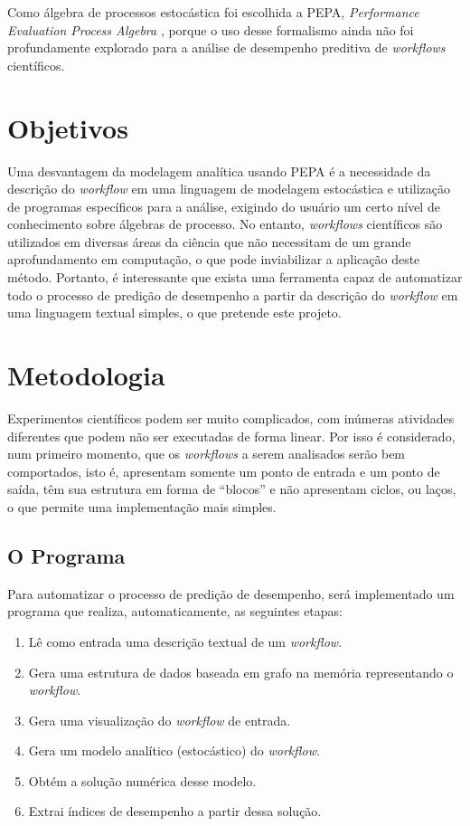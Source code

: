 \documentclass[a4paper,11pt]{article}
\begin{document}
  	Como álgebra de processos estocástica foi escolhida a PEPA, \emph{Performance Evaluation Process Algebra} \cite{web:pepa}, porque o uso desse formalismo ainda não foi profundamente explorado para a análise de desempenho preditiva de \emph{workflows} científicos.
  	
  \section{Objetivos}

  	Uma desvantagem da modelagem analítica usando PEPA é a necessidade da descrição do \emph{workflow} em uma linguagem de modelagem estocástica e utilização de programas específicos para a análise, exigindo do usuário um certo nível de conhecimento sobre álgebras de processo. No entanto, \emph{workflows} científicos são utilizados em diversas áreas da ciência que não necessitam de um grande aprofundamento em computação, o que pode inviabilizar a aplicação deste método. Portanto, é interessante que exista uma ferramenta capaz de automatizar todo o processo de predição de desempenho a partir da descrição do \emph{workflow} em uma linguagem textual simples, o que pretende este projeto.

  \newpage
  \section{Metodologia}

  	Experimentos científicos podem ser muito complicados, com inúmeras atividades diferentes que podem não ser executadas de forma linear. Por isso é considerado, num primeiro momento, que os \emph{workflows} a serem analisados serão bem comportados, isto é, apresentam somente um ponto de entrada e um ponto de saída, têm sua estrutura em forma de ``blocos''  e não apresentam ciclos, ou laços, o que permite uma implementação mais simples.


  	\subsection{O Programa}
  		Para automatizar o processo de predição de desempenho, será implementado um programa que realiza, automaticamente, as seguintes etapas:

  		\begin{enumerate}
  			\item Lê como entrada uma descrição textual de um \emph{workflow}.
  			\item Gera uma estrutura de dados baseada em grafo na memória representando o \emph{workflow}.
  			\item Gera uma visualização do \emph{workflow} de entrada.
  			\item Gera um modelo analítico (estocástico) do \emph{workflow}.
  			\item Obtém a solução numérica desse modelo.
  			\item Extrai índices de desempenho a partir dessa solução.
  		\end{enumerate}
\end{document}
